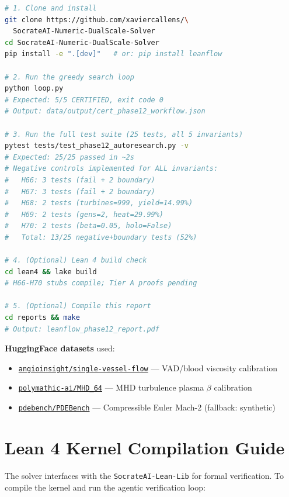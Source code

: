 \documentclass[10pt,twocolumn]{article}
\begin{document}
\begin{codebox}
\begin{lstlisting}[language=bash]
# 1. Clone and install
git clone https://github.com/xaviercallens/\
  SocrateAI-Numeric-DualScale-Solver
cd SocrateAI-Numeric-DualScale-Solver
pip install -e ".[dev]"   # or: pip install leanflow

# 2. Run the greedy search loop
python loop.py
# Expected: 5/5 CERTIFIED, exit code 0
# Output: data/output/cert_phase12_workflow.json

# 3. Run the full test suite (25 tests, all 5 invariants)
pytest tests/test_phase12_autoresearch.py -v
# Expected: 25/25 passed in ~2s
# Negative controls implemented for ALL invariants:
#   H66: 3 tests (fail + 2 boundary)
#   H67: 3 tests (fail + 2 boundary)
#   H68: 2 tests (turbines=999, yield=14.99%)
#   H69: 2 tests (gens=2, heat=29.99%)
#   H70: 2 tests (beta=0.05, holo=False)
#   Total: 13/25 negative+boundary tests (52%)

# 4. (Optional) Lean 4 build check
cd lean4 && lake build
# H66-H70 stubs compile; Tier A proofs pending

# 5. (Optional) Compile this report
cd reports && make
# Output: leanflow_phase12_report.pdf
\end{lstlisting}
\end{codebox}

\noindent \textbf{HuggingFace datasets} used:
\begin{itemize}[nosep]
  \item \href{https://huggingface.co/datasets/angioinsight/single-vessel-flow}{\texttt{angioinsight/single-vessel-flow}} --- VAD/blood viscosity calibration
  \item \href{https://huggingface.co/datasets/polymathic-ai/MHD_64}{\texttt{polymathic-ai/MHD\_64}} --- MHD turbulence plasma $\beta$ calibration
  \item \href{https://huggingface.co/datasets/pdebench/PDEBench}{\texttt{pdebench/PDEBench}} --- Compressible Euler Mach-2 (fallback: synthetic) \cite{takamoto2022pdebench}
\end{itemize}

\section{Lean 4 Kernel Compilation Guide}
\label{sec:lean4_compilation}

The solver interfaces with the \texttt{SocrateAI-Lean-Lib} for formal verification. 
To compile the kernel and run the agentic verification loop:
\end{document}
